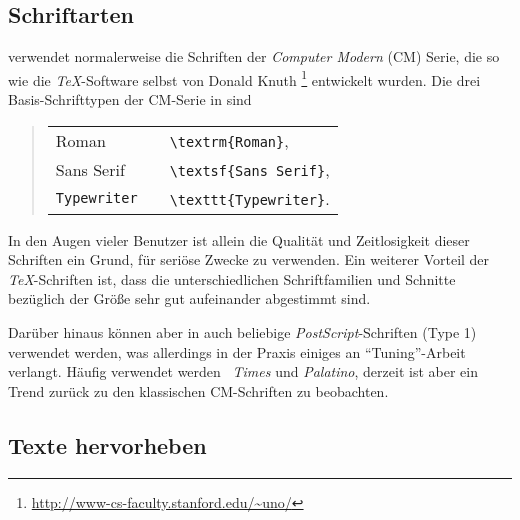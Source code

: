 \subsection{Schriftarten}

\latex verwendet normalerweise die Schriften der \emph{Computer
Modern}
(CM) Serie, die so wie die \emph{TeX}-Software selbst von Donald Knuth%
\footnote{\url{http://www-cs-faculty.stanford.edu/~uno/}} entwickelt
wurden. Die drei Basis-Schrifttypen der CM-Serie in \latex sind
%
\begin{quote}
\begin{tabular}{lcl}
\textrm{Roman}      & & \verb!\textrm{Roman}!,\\
\textsf{Sans Serif} & & \verb!\textsf{Sans Serif}!,\\
\texttt{Typewriter} & & \verb!\texttt{Typewriter}!.\\
\end{tabular}
\end{quote}
%
\noindent In den Augen vieler Benutzer ist allein die Qualität und
Zeitlosigkeit dieser Schriften ein Grund, \latex für seriöse
Zwecke zu verwenden. Ein weiterer Vorteil der \emph{TeX}-Schriften
ist, dass die unterschiedlichen Schriftfamilien und Schnitte
bezüglich der Größe sehr gut aufeinander abgestimmt sind.

Darüber hinaus können aber in \latex auch beliebige 
\emph{PostScript}-Schrif\-ten (Type 1) verwendet werden, was allerdings in
der Praxis einiges an "`Tuning"'-Arbeit verlangt. Häufig verwendet
werden \zB\ \emph{Times} und \emph{Palatino}, derzeit ist aber ein Trend 
zurück zu den klassischen CM-Schriften zu beobachten.



\subsection{Texte hervorheben}

